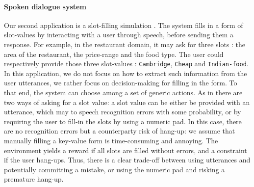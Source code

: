 \documentclass{article}
\begin{document}
\paragraph{Spoken dialogue system}
Our second application is a slot-filling simulation \citep{Li2009ReinforcementLF,chandramohan2010optimizing}. The system fills in a form of slot-values by interacting with a user through speech, before sending them a response. For example, in the restaurant domain, it may ask for three slots : the area of the restaurant, the price-range and the food type. The user could respectively provide those three slot-values : \texttt{Cambridge}, \texttt{Cheap} and \texttt{Indian-food}. In this application, we do not focus on how to extract such information from the user utterances, we rather focus on decision-making for filling in the form. To that end, the system can choose among a set of generic actions. As in \citep{carrara2018safe} there are two ways of asking for a slot value: a slot value can be either be provided with an utterance, which may to speech recognition errors with some probability, or by requiring the user to fill-in the slots by using a numeric pad. In this case, there are no recognition errors but a counterparty risk of hang-up: we assume that manually filling a key-value form is time-consuming and annoying. The environment yields a reward if all slots are filled without errors, and a constraint if the user hang-ups. Thus, there is a clear trade-off between using utterances and potentially committing a mistake, or using the numeric pad and risking a premature hang-up.
\end{document}
